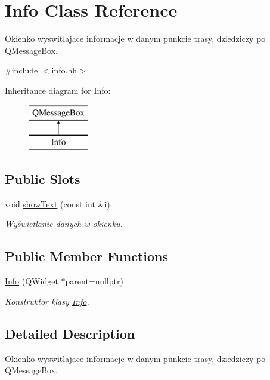 \hypertarget{class_info}{}\section{Info Class Reference}
\label{class_info}


Okienko wyswitlajace informacje w danym punkcie trasy, dziedziczy po Q\+Message\+Box.  




{\ttfamily \#include $<$info.\+hh$>$}

Inheritance diagram for Info\+:\begin{figure}[H]
\begin{center}
\leavevmode
\includegraphics[height=2.000000cm]{class_info}
\end{center}
\end{figure}
\subsection*{Public Slots}
\begin{DoxyCompactItemize}
\item 
void \hyperlink{class_info_a4e4b10d7c315720a5d99dbca038f64e7}{show\+Text} (const int \&i)
\begin{DoxyCompactList}\small\item\em Wyświetlanie danych w okienku. \end{DoxyCompactList}\end{DoxyCompactItemize}
\subsection*{Public Member Functions}
\begin{DoxyCompactItemize}
\item 
\hyperlink{class_info_afcb88abfe58feb88016042142faac5eb}{Info} (Q\+Widget $\ast$parent=nullptr)
\begin{DoxyCompactList}\small\item\em Konstruktor klasy \hyperlink{class_info}{Info}. \end{DoxyCompactList}\end{DoxyCompactItemize}


\subsection{Detailed Description}
Okienko wyswitlajace informacje w danym punkcie trasy, dziedziczy po Q\+Message\+Box. 

